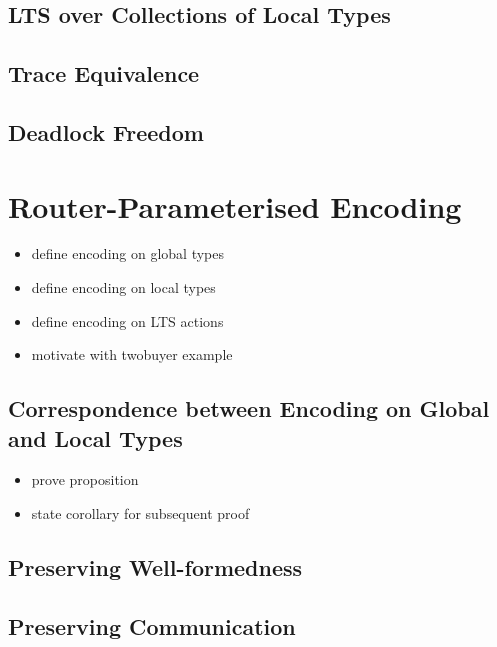 \subsection{LTS over Collections of Local Types}

\subsection{Trace Equivalence}

\subsection{Deadlock Freedom}

\section{Router-Parameterised Encoding}

\begin{itemize}
\item define encoding on global types
\item define encoding on local types
\item define encoding on LTS actions
\item motivate with twobuyer example
\end{itemize}

\subsection{Correspondence between Encoding on Global and Local Types}
\begin{itemize}
\item prove proposition
\item state corollary for subsequent proof
\end{itemize}

\subsection{Preserving Well-formedness}

\subsection{Preserving Communication}